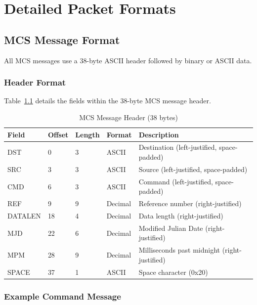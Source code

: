 
\chapter{Detailed Packet Formats}
\label{app:packets}

\section{MCS Message Format}

All MCS messages use a 38-byte ASCII header followed by binary or ASCII data.

\subsection{Header Format}

Table~\ref{tab:mcs-header-detail} details the fields within the 38-byte MCS message header.

\begin{table}[htbp]
    \centering
    \caption{MCS Message Header (38 bytes)}
    \label{tab:mcs-header-detail}
    \begin{tabular}{llllp{5cm}}
        \toprule
        \textbf{Field} & \textbf{Offset} & \textbf{Length} & \textbf{Format} & \textbf{Description} \\
        \midrule
        DST & 0 & 3 & ASCII & Destination (left-justified, space-padded) \\
        SRC & 3 & 3 & ASCII & Source (left-justified, space-padded) \\
        CMD & 6 & 3 & ASCII & Command (left-justified, space-padded) \\
        REF & 9 & 9 & Decimal & Reference number (right-justified) \\
        DATALEN & 18 & 4 & Decimal & Data length (right-justified) \\
        MJD & 22 & 6 & Decimal & Modified Julian Date (right-justified) \\
        MPM & 28 & 9 & Decimal & Milliseconds past midnight (right-justified) \\
        SPACE & 37 & 1 & ASCII & Space character (0x20) \\
        \bottomrule
    \end{tabular}
\end{table}

\subsection{Example Command Message}

